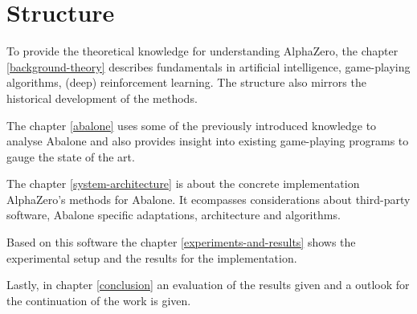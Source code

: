 \section{Structure}
To provide the theoretical knowledge for understanding AlphaZero, the chapter \ref{background-theory} describes fundamentals in artificial intelligence, game-playing algorithms, (deep) reinforcement learning. The structure also mirrors the historical development of the methods.

The chapter \ref{abalone} uses some of the previously introduced knowledge to analyse Abalone and also provides insight into existing game-playing programs to gauge the state of the art.

The chapter \ref{system-architecture} is about the concrete implementation AlphaZero's methods for Abalone. It ecompasses considerations about third-party software, Abalone specific adaptations, architecture and algorithms.

Based on this software the chapter \ref{experiments-and-results} shows the experimental setup and the results for the implementation.

Lastly, in chapter \ref{conclusion} an evaluation of the results given and a outlook for the continuation of the work is given.
